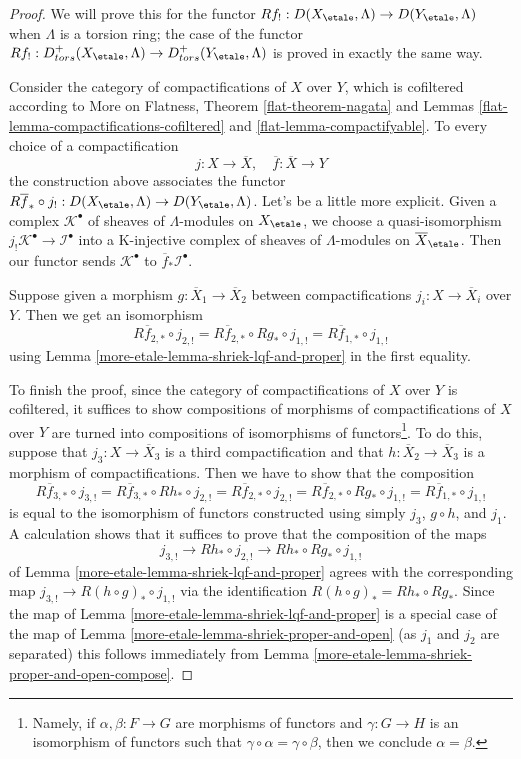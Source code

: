 \begin{proof}
We will prove this for the functor
$Rf_! : D(X_\etale, \Lambda) \to D(Y_\etale, \Lambda)$
when $\Lambda$ is a torsion ring; the case of the functor
$Rf_! : D^+_{tors}(X_\etale, \Lambda) \to D^+_{tors}(Y_\etale, \Lambda)$
is proved in exactly the same way.

\medskip\noindent
Consider the category of compactifications of $X$ over $Y$, which is
cofiltered according to More on Flatness, Theorem \ref{flat-theorem-nagata} and
Lemmas \ref{flat-lemma-compactifications-cofiltered} and
\ref{flat-lemma-compactifyable}.
To every choice of a compactification
$$
j : X \to \overline{X},\quad \overline{f} : \overline{X} \to Y
$$
the construction above associates the functor $R\overline{f}_* \circ j_! :
D(X_\etale, \Lambda) \to D(Y_\etale, \Lambda)$.
Let's be a little more explicit. Given a complex $\mathcal{K}^\bullet$
of sheaves of $\Lambda$-modules on $X_\etale$, we choose a quasi-isomorphism
$j_!\mathcal{K}^\bullet \to \mathcal{I}^\bullet$ into a K-injective
complex of sheaves of $\Lambda$-modules on $\overline{X}_\etale$.
Then our functor sends $\mathcal{K}^\bullet$ to
$\overline{f}_*\mathcal{I}^\bullet$.

\medskip\noindent
Suppose given a morphism $g : \overline{X}_1 \to \overline{X}_2$
between compactifications $j_i : X \to \overline{X}_i$ over $Y$.
Then we get an isomorphism
$$
R\overline{f}_{2, *} \circ j_{2, !} =
R\overline{f}_{2, *} \circ Rg_* \circ j_{1, !} =
R\overline{f}_{1, *} \circ j_{1, !}
$$
using Lemma \ref{more-etale-lemma-shriek-lqf-and-proper} in the first equality.

\medskip\noindent
To finish the proof, since the category of compactifications of $X$ over $Y$
is cofiltered, it suffices to show compositions of morphisms of
compactifications of $X$ over $Y$ are turned into compositions of
isomorphisms of functors\footnote{Namely, if $\alpha, \beta : F \to G$
are morphisms of functors and $\gamma : G \to H$ is an isomorphism
of functors such that $\gamma \circ \alpha = \gamma \circ \beta$, then
we conclude $\alpha = \beta$.}. To do this, suppose that
$j_3 : X \to \overline{X}_3$
is a third compactification and that $h : \overline{X}_2 \to \overline{X}_3$
is a morphism of compactifications. Then we have to show that the
composition
$$
R\overline{f}_{3, *} \circ j_{3, !} =
R\overline{f}_{3, *} \circ Rh_* \circ j_{2, !} =
R\overline{f}_{2, *} \circ j_{2, !} =
R\overline{f}_{2, *} \circ Rg_* \circ j_{1, !} =
R\overline{f}_{1, *} \circ j_{1, !}
$$
is equal to the isomorphism of functors constructed using simply
$j_3$, $g \circ h$, and $j_1$. A calculation shows that it suffices to
prove that the composition of the maps
$$
j_{3, !} \to Rh_* \circ j_{2, !} \to Rh_* \circ Rg_* \circ j_{1, !}
$$
of Lemma \ref{more-etale-lemma-shriek-lqf-and-proper} agrees with the corresponding
map $j_{3, !} \to R(h \circ g)_* \circ j_{1, !}$
via the identification $R(h \circ g)_* = Rh_* \circ Rg_*$.
Since the map of Lemma \ref{more-etale-lemma-shriek-lqf-and-proper}
is a special case of the map of Lemma \ref{more-etale-lemma-shriek-proper-and-open}
(as $j_1$ and $j_2$ are separated) this follows immediately from
Lemma \ref{more-etale-lemma-shriek-proper-and-open-compose}.
\end{proof}


